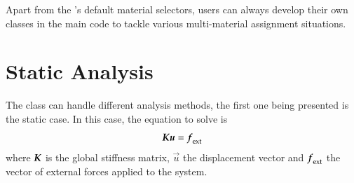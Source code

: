 Apart from the \akantu's default material selectors, users can always
develop their own classes in the main code to tackle various
multi-material assignment situations.



\section{Static Analysis\label{sect:smm:static}}

The  class can handle different analysis
methods, the first one being presented is the static case.  In this
case, the equation to solve is
\begin{equation}
  \label{eqn:smm:static} \boldsymbol{K} \boldsymbol{u} =
  \boldsymbol{f}_{{\mathrm{ext}}}
\end{equation}
where $\boldsymbol{K}$ is the global stiffness matrix, $\vec{u}$ the
displacement vector and $\boldsymbol{f}_{{\mathrm{ext}}}$ the vector of external
forces applied to the system.

